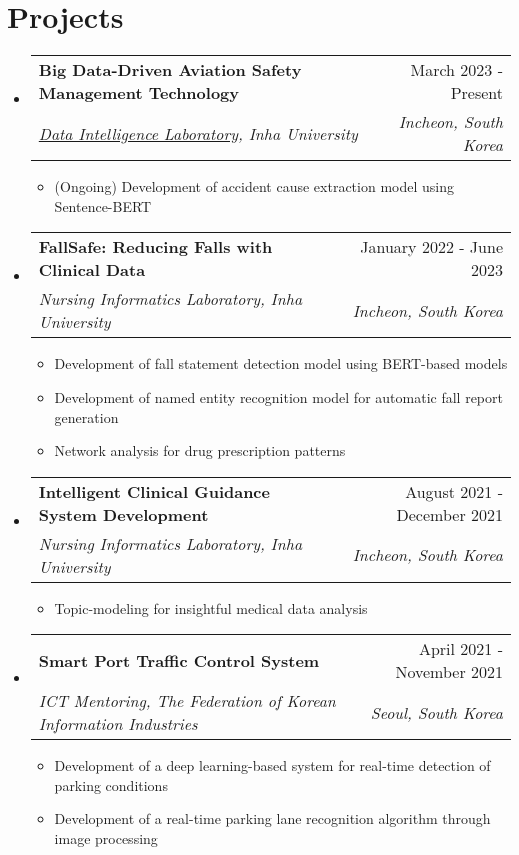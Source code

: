 \documentclass[letterpaper,11pt]{article}
\makeatletter
\newcommand{\resumeSubheading}[4]{
  \vspace{-1pt}\item
    \begin{tabular*}{0.97\textwidth}{l@{\extracolsep{\fill}}r}
      #1 & #2 \\
      \textit{\small#3} & \textit{\small #4} \\
    \end{tabular*}\vspace{-5pt}
}
\makeatother
\begin{document}
    \section{Projects}
    \begin{itemize}[leftmargin=*,label=]
        \resumeSubheading
        {\textbf{Big Data-Driven Aviation Safety Management Technology}}{March 2023 - Present}
            {\href{http://dilab.inha.ac.kr/}{Data Intelligence Laboratory}, Inha University}{Incheon, South Korea}
            \begin{itemize}[label=\bullet]
                \item{(Ongoing) Development of accident cause extraction model using Sentence-BERT}
            \end{itemize}
        \resumeSubheading
        {\textbf{FallSafe: Reducing Falls with Clinical Data}}{January 2022 - June 2023}
            {Nursing Informatics Laboratory, Inha University}{Incheon, South Korea}
            \begin{itemize}[label=\bullet]
                \item{Development of fall statement detection model using BERT-based models}
                \item{Development of named entity recognition model for automatic fall report generation}
                \item{Network analysis for drug prescription patterns}
            \end{itemize}
        \resumeSubheading
        {\textbf{Intelligent Clinical Guidance System Development}}{August 2021 - December 2021}
            {Nursing Informatics Laboratory, Inha University}{Incheon, South Korea}
            \begin{itemize}[label=\bullet]
                \item{Topic-modeling for insightful medical data analysis}
            \end{itemize}
        \resumeSubheading
        {\textbf{Smart Port Traffic Control System}}{April 2021 - November 2021}
            {ICT Mentoring, The Federation of Korean Information Industries}{Seoul, South Korea}
            \begin{itemize}[label=\bullet]
                \item{Development of a deep learning-based system for real-time detection of parking conditions}
                \item{Development of a real-time parking lane recognition algorithm through image processing}
            \end{itemize}
    \end{itemize}
    
\end{document}
